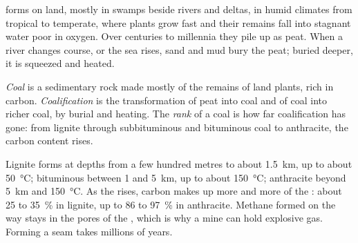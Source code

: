  forms on land, mostly in swamps beside rivers and deltas, in humid
climates from tropical to temperate, where plants grow fast and their remains
fall into stagnant water poor in oxygen. Over centuries to millennia they pile
up as peat. When a river changes course, or the sea rises, sand and mud bury
the peat; buried deeper, it is squeezed and heated.

\begin{definition}\label{def:g11:fossil-fuel-geology:coal}
\emph{Coal} is a sedimentary rock made mostly of the remains of
land plants, rich in carbon. \emph{Coalification} is the
transformation of peat into coal and of coal into richer coal, by burial and
heating. The \emph{rank} of a coal is how far
coalification has gone: from lignite through subbituminous and bituminous
coal to anthracite, the carbon content rises.
\end{definition}

Lignite forms at depths from a few hundred metres to about \qty{1.5}{km},
up to about \qty{50}{\degreeCelsius}; bituminous  between 1 and
\qty{5}{km}, up to about \qty{150}{\degreeCelsius}; anthracite beyond
\qty{5}{km} and \qty{150}{\degreeCelsius}. As the  rises, carbon makes
up more and more of the : about
25 to \qty{35}{\percent} in lignite, up to 86 to \qty{97}{\percent} in
anthracite. Methane formed on the way stays in the pores of the , which
is why a  mine can hold explosive gas. Forming a  seam takes millions
of years.

